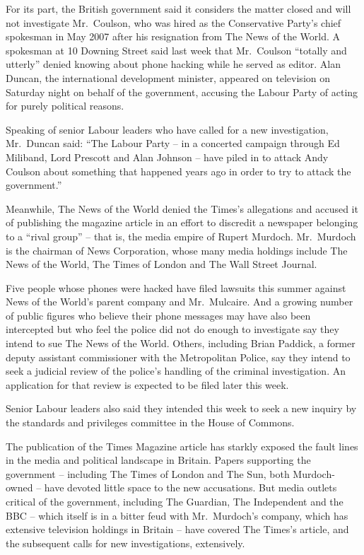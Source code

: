﻿\documentclass[12pt]{article}
\begin{document}
For its part, the British government said it considers the matter closed and will not investigate
Mr.~Coulson, who was hired as the Conservative Party's chief spokesman in May 2007 after his
resignation from The News of the World. A spokesman at 10 Downing Street said last week that
Mr.~Coulson ``totally and utterly'' denied knowing about phone hacking while he served as editor.
Alan Duncan, the international development minister, appeared on television on Saturday night on
behalf of the government, accusing the Labour Party of acting for purely political reasons.

Speaking of senior Labour leaders who have called for a new investigation, Mr.~Duncan said: ``The
Labour Party -- in a concerted campaign through Ed Miliband, Lord Prescott and Alan Johnson -- have
piled in to attack Andy Coulson about something that happened years ago in order to try to attack
the government.''

Meanwhile, The News of the World denied the Times's allegations and accused it of publishing the
magazine article in an effort to discredit a newspaper belonging to a ``rival group'' -- that is,
the media empire of Rupert Murdoch. Mr.~Murdoch is the chairman of News Corporation, whose many
media holdings include The News of the World, The Times of London and The Wall Street Journal.

Five people whose phones were hacked have filed lawsuits this summer against News of the World's
parent company and Mr.~Mulcaire. And a growing number of public figures who believe their phone
messages may have also been intercepted but who feel the police did not do enough to investigate say
they intend to sue The News of the World. Others, including Brian Paddick, a former deputy assistant
commissioner with the Metropolitan Police, say they intend to seek a judicial review of the police's
handling of the criminal investigation. An application for that review is expected to be filed later
this week.

Senior Labour leaders also said they intended this week to seek a new inquiry by the standards and
privileges committee in the House of Commons.

The publication of the Times Magazine article has starkly exposed the fault lines in the media and
political landscape in Britain. Papers supporting the government -- including The Times of London
and The Sun, both Murdoch-owned -- have devoted little space to the new accusations. But media
outlets critical of the government, including The Guardian, The Independent and the BBC -- which
itself is in a bitter feud with Mr.~Murdoch's company, which has extensive television holdings in
Britain -- have covered The Times's article, and the subsequent calls for new investigations,
extensively.
\end{document}
